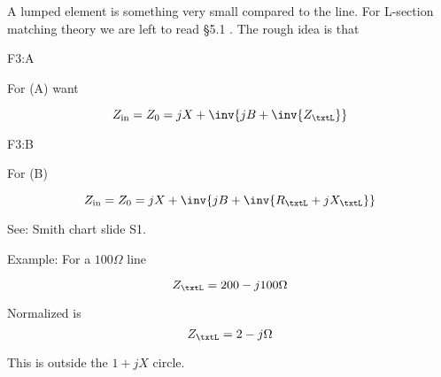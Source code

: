 A lumped element is something very small compared to the line.  For L-section matching theory we are left to read \S 5.1 \citep{pozar2009microwave}.  The rough idea is that

F3:A

For (A) want 

\begin{equation}\label{eqn:uwavesDeck6LCmatchingCore:180}
Z_{\textrm{in}} = Z_0 = j X + \inv{ j B + \inv{Z_\txtL} }
\end{equation}

F3:B

For (B) 

\begin{equation}\label{eqn:uwavesDeck6LCmatchingCore:200}
Z_{\textrm{in}} = Z_0 = j X + \inv{ j B + \inv{R_\txtL + j X_\txtL} }
\end{equation}

See: Smith chart slide S1.

Example: For a \( 100 \Omega \) line

\begin{equation}\label{eqn:uwavesDeck6LCmatchingCore:220}
Z_\txtL = 200 -j 100 \Omega 
\end{equation}

Normalized is
\begin{equation}\label{eqn:uwavesDeck6LCmatchingCore:240}
Z_\txtL = 2 -j \Omega 
\end{equation}

This is outside the \( 1 + j X \) circle.
